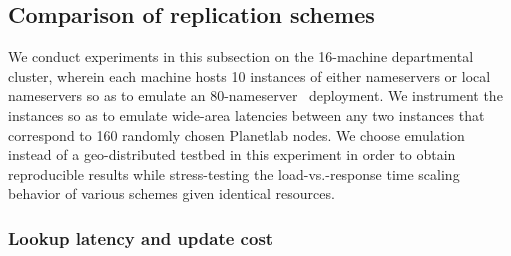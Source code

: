 \vsp
\subsection{Comparison of replication schemes}
\label{sec:comparison}

We conduct experiments in this subsection on the 16-machine departmental cluster, wherein each machine hosts 10 instances of either nameservers or local nameservers so as to emulate an 80-nameserver \auspice\ deployment. We instrument the instances so as to emulate wide-area latencies between any two instances that correspond to 160 randomly chosen Planetlab nodes. We choose emulation instead of a geo-distributed testbed in this experiment in order to obtain reproducible results while stress-testing the load-vs.-response time scaling behavior of various schemes given identical resources.

\vsp
\subsubsection{Lookup latency and update cost}
\label{sec:lookup}
\label{sec:lowload}





%

